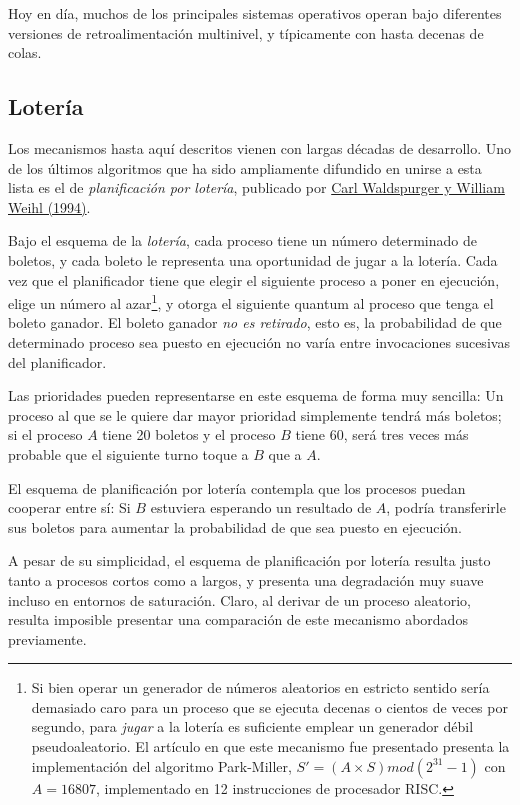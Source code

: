 \documentclass[11pt,fleqn]{book} %
\begin{document}
Hoy en día, muchos de los principales sistemas operativos operan bajo
diferentes versiones de retroalimentación multinivel, y típicamente
con hasta decenas de colas.
\subsection{Lotería}
\label{sec-4-2-7}


Los mecanismos hasta aquí descritos vienen con largas décadas de
desarrollo. Uno de los últimos algoritmos que ha sido ampliamente
difundido en unirse a esta lista es el de \emph{planificación por lotería},
publicado por \href{http://www.waldspurger.org/carl/papers/lottery-osdi94.pdf}{Carl Waldspurger y William Weihl (1994)}.

Bajo el esquema de la \emph{lotería}, cada proceso tiene un número
determinado de boletos, y cada boleto le representa una oportunidad de
jugar a la lotería. Cada vez que el planificador tiene que elegir el
siguiente proceso a poner en ejecución, elige un número al azar\footnote{Si bien operar un generador de números aleatorios en estricto sentido
sería demasiado caro para un proceso que se ejecuta decenas o cientos
de veces por segundo, para \emph{jugar} a la lotería es suficiente emplear
un generador débil pseudoaleatorio. El artículo en que este mecanismo
fue presentado presenta la implementación del algoritmo Park-Miller,
$S' = (A \times S) mod (2^{31} - 1)$ con $A = 16807$, implementado en
12 instrucciones de procesador RISC. }, y otorga el siguiente quantum
al proceso que tenga el boleto ganador. El boleto ganador \emph{no es retirado}, esto es, la probabilidad de que determinado proceso sea
puesto en ejecución no varía entre invocaciones sucesivas del
planificador.

Las prioridades pueden representarse en este esquema de forma muy
sencilla: Un proceso al que se le quiere dar mayor prioridad
simplemente tendrá más boletos; si el proceso $A$ tiene 20 boletos y
el proceso $B$ tiene 60, será tres veces más probable que el siguiente
turno toque a $B$ que a $A$.

El esquema de planificación por lotería contempla que los procesos
puedan cooperar entre sí: Si $B$ estuviera esperando un resultado de
$A$, podría transferirle sus boletos para aumentar la probabilidad de
que sea puesto en ejecución.

A pesar de su simplicidad, el esquema de planificación por lotería
resulta justo tanto a procesos cortos como a largos, y presenta una
degradación muy suave incluso en entornos de saturación. Claro, al
derivar de un proceso aleatorio, resulta imposible presentar una
comparación de este mecanismo abordados previamente.
\end{document}
